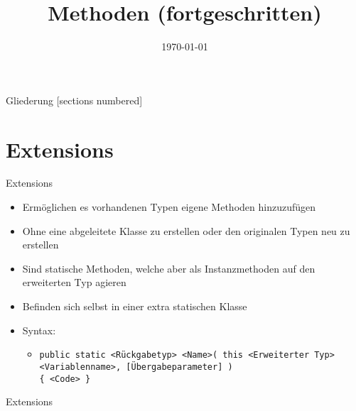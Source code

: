 



\title{Methoden (fortgeschritten)}
\date{\today}




\maketitle

\begin{frame}{Gliederung}
	[sections numbered]
	\tableofcontents
\end{frame}

\section{Extensions}
\begin{frame}{Extensions}
	\begin{itemize}
		\item Ermöglichen es vorhandenen Typen eigene Methoden hinzuzufügen
		\item Ohne eine abgeleitete Klasse zu erstellen oder den originalen Typen neu zu erstellen
		\item Sind statische Methoden, welche aber als Instanzmethoden auf den erweiterten Typ agieren
		\item Befinden sich selbst in einer extra statischen Klasse
		\item Syntax:
		\begin{itemize}
			\item \texttt{public static \alert{<Rückgabetyp> <Name>}( this \alert{<Erweiterter Typ> <Variablenname>}, \alert{[Übergabeparameter]} )\\ \{ \alert{<Code>} \}}
		\end{itemize}
	\end{itemize}
\end{frame}

\begin{frame}{Extensions}
	
\end{frame}

